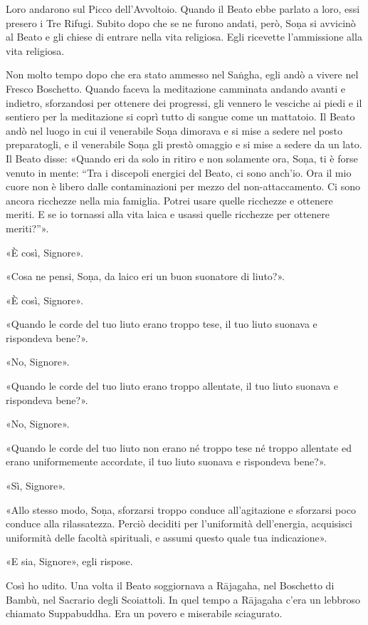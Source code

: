 Loro andarono sul Picco dell’Avvoltoio. Quando il Beato ebbe parlato a loro,
essi presero i Tre Rifugi. Subito dopo che se ne furono andati, però, Soṇa si
avvicinò al Beato e gli chiese di entrare nella vita religiosa. Egli ricevette
l’ammissione alla vita religiosa.

Non molto tempo dopo che era stato ammesso nel Saṅgha, egli andò a vivere nel
Fresco Boschetto. Quando faceva la meditazione camminata andando avanti e
indietro, sforzandosi per ottenere dei progressi, gli vennero le vesciche ai
piedi e il sentiero per la meditazione si coprì tutto di sangue come un
mattatoio. Il Beato andò nel luogo in cui il venerabile Soṇa dimorava e si mise
a sedere nel posto preparatogli, e il venerabile Soṇa gli prestò omaggio e si
mise a sedere da un lato. Il Beato disse: «Quando eri da solo in ritiro e non
solamente ora, Soṇa, ti è forse venuto in mente: “Tra i discepoli energici del
Beato, ci sono anch’io. Ora il mio cuore non è libero dalle contaminazioni per
mezzo del non-attaccamento. Ci sono ancora ricchezze nella mia famiglia. Potrei
usare quelle ricchezze e ottenere meriti. E se io tornassi alla vita laica e
usassi quelle ricchezze per ottenere meriti?”».

«È così, Signore».

«Cosa ne pensi, Soṇa, da laico eri un buon suonatore di liuto?».

«È così, Signore».

«Quando le corde del tuo liuto erano troppo tese, il tuo liuto suonava e
rispondeva bene?».

«No, Signore».

«Quando le corde del tuo liuto erano troppo allentate, il tuo liuto suonava e
rispondeva bene?».

«No, Signore».

«Quando le corde del tuo liuto non erano né troppo tese né troppo allentate ed
erano uniformemente accordate, il tuo liuto suonava e rispondeva bene?».

«Sì, Signore».

«Allo stesso modo, Soṇa, sforzarsi troppo conduce all’agitazione e sforzarsi
poco conduce alla rilassatezza. Perciò deciditi per l’uniformità dell’energia,
acquisisci uniformità delle facoltà spirituali, e assumi questo quale tua
indicazione».

«E sia, Signore», egli rispose.


 Così ho udito. Una volta il Beato soggiornava a Rājagaha,
nel Boschetto di Bambù, nel Sacrario degli Scoiattoli. In quel tempo a Rājagaha
c’era un lebbroso chiamato Suppabuddha. Era un povero e miserabile sciagurato.


